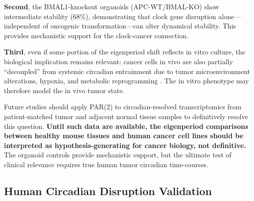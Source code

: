 \documentclass[11pt,a4paper]{article}
\begin{document}
\textbf{Second}, the BMAL1-knockout organoids (APC-WT/BMAL-KO) show intermediate stability (68\%), demonstrating that clock gene disruption alone---independent of oncogenic transformation---can alter dynamical stability. This provides mechanistic support for the clock-cancer connection.

\textbf{Third}, even if some portion of the eigenperiod shift reflects in vitro culture, the biological implication remains relevant: cancer cells in vivo are also partially ``decoupled'' from systemic circadian entrainment due to tumor microenvironment alterations, hypoxia, and metabolic reprogramming \citep{masri2015circadian}. The in vitro phenotype may therefore model the in vivo tumor state.

Future studies should apply PAR(2) to circadian-resolved transcriptomics from patient-matched tumor and adjacent normal tissue samples to definitively resolve this question. \textbf{Until such data are available, the eigenperiod comparisons between healthy mouse tissues and human cancer cell lines should be interpreted as hypothesis-generating for cancer biology, not definitive.} The organoid controls provide mechanistic support, but the ultimate test of clinical relevance requires true human tumor circadian time-courses.

\subsection{Human Circadian Disruption Validation}
\end{document}
